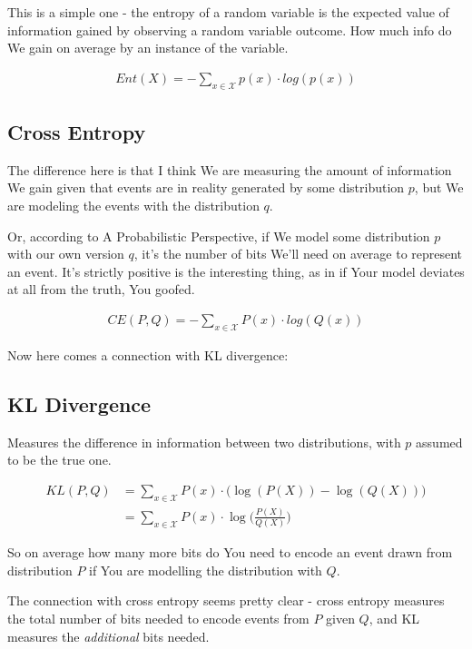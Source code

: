 \documentclass{article}
\begin{document}
		This is a simple one - the entropy of a random variable is the expected value of information gained by observing a random variable outcome. How much info do We gain on average by an instance of the variable.
		
		\begin{align}
			Ent(X) = -\sum_{x\in\mathcal{X}} p(x)\cdot log(p(x))
		\end{align}
		
	\subsection{Cross Entropy}
	
		The difference here is that I think We are measuring the amount of information We gain given that events are in reality generated by some distribution $p$, but We are modeling the events with the distribution $q$.
		
		Or, according to A Probabilistic Perspective, if We model some distribution $p$ with our own version $q$, it's the number of bits We'll need on average to represent an event. It's strictly positive is the interesting thing, as in if Your model deviates at all from the truth, You goofed.
		
		\begin{align}
			CE(P, Q) = -\sum_{x\in\mathcal{X}} P(x)\cdot log(Q(x))
		\end{align}
		
		Now here comes a connection with KL divergence:
		
	\subsection{KL Divergence}
	
		Measures the difference in information between two distributions, with $p$ assumed to be the true one.
		
		\begin{align}
			KL(P, Q) &= \sum_{x\in\mathcal{X}} P(x)\cdot\big(\log(P(X)) - \log(Q(X)) \big)\\
			&= \sum_{x\in\mathcal{X}} P(x)\cdot\log\bigg(\frac{P(X)}{Q(X)}\bigg)
		\end{align}
		
		So on average how many more bits do You need to encode an event drawn from distribution $P$ if You are modelling the distribution with $Q$.
		
		The connection with cross entropy seems pretty clear - cross entropy measures the total number of bits needed to encode events from $P$ given $Q$, and KL measures the \textit{additional} bits needed.
		
\end{document}
